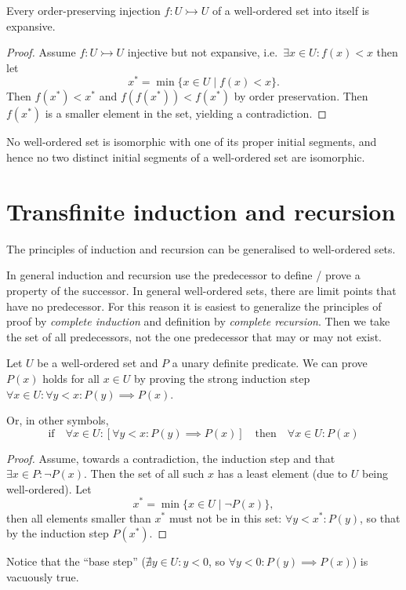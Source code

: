 \begin{proposition} \label{injectionsExpansive}
Every order-preserving injection $f: U\rightarrowtail U$ of a well-ordered set into itself is expansive.
\end{proposition}
\begin{proof}
Assume $f: U\rightarrowtail U$ injective but not expansive, i.e.\ $\exists x\in U: f(x)<x$ then let
\[ x^* = \min\{x\in U\;|\;f(x)<x\}. \]
Then $f(x^*)<x^*$ and $f(f(x^*)) < f(x^*)$ by order preservation. Then $f(x^*)$ is a smaller element in the set, yielding a contradiction.
\end{proof}
\begin{corollary} \label{properInitialSegmentNotIsomorphic}
No well-ordered set is isomorphic with one of its proper initial
segments, and hence no two distinct initial segments of a well-ordered set are
isomorphic.
\end{corollary}


\section{Transfinite induction and recursion}
The principles of induction and recursion can be generalised to well-ordered sets.

In general induction and recursion use the predecessor to define / prove a property of the successor. In general well-ordered sets, there are limit points that have no predecessor. For this reason it is easiest to generalize the principles of proof by \textit{complete
induction} and definition by \textit{complete recursion}. Then we take the set of all predecessors, not the one predecessor that may or may not exist.

\begin{theorem}
Let $U$ be a well-ordered set and $P$ a unary definite predicate. We can prove $P(x)$ holds for all $x\in U$ by proving the strong induction step $\forall x\in U: \forall y<x: P(y)\implies P(x)$.

Or, in other symbols,
\[ \text{if}\quad  \forall x\in U: \left[\forall y < x: P(y)\implies P(x)\right] \quad \text{then}\quad \forall x\in U: P(x) \]
\end{theorem}
\begin{proof}
Assume, towards a contradiction, the induction step and that $\exists x\in P: \neg P(x)$. Then the set of all such $x$ has a least element (due to $U$ being well-ordered). Let
\[ x^* = \min\{ x\in U\;|\; \neg P(x) \}, \]
then all elements smaller than $x^*$ must not be in this set: $\forall y<x^*: P(y)$, so that by the induction step $P(x^*)$.
\end{proof}
Notice that the ``base step'' ($\nexists y\in U: y<0$, so $\forall y<0: P(y)\implies P(x)$) is vacuously true.

